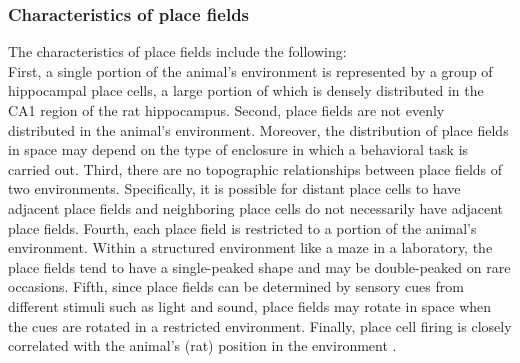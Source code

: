 \subsubsection{Characteristics of place fields}
The characteristics of place fields \cite{OKeefe1978,Burgess1994} include the following:\\
First, a single portion of the animal's environment is represented by a group
of hippocampal place cells, a large portion of which is densely distributed
in the CA1 region of the rat hippocampus.
Second, place fields are not evenly distributed in the animal's environment.
Moreover, the distribution of place fields in space may depend on the type
of enclosure in which a behavioral task is carried out.
Third, there are no topographic relationships between place fields of two environments. Specifically, it is possible for distant place cells to have adjacent place fields and neighboring place cells do not necessarily have adjacent place fields.
Fourth, each place field is restricted to a portion of the animal's environment.
Within a structured environment like a maze in a laboratory, the place fields
tend to have a single-peaked shape and may be double-peaked on rare  occasions.
Fifth, since place fields can be determined by sensory cues from different
stimuli such as light and sound, place fields may rotate in space when the cues are rotated in a restricted environment.
Finally, place cell firing is closely correlated with the animal's (rat) position
in the environment \cite{1993Doth}.




















































